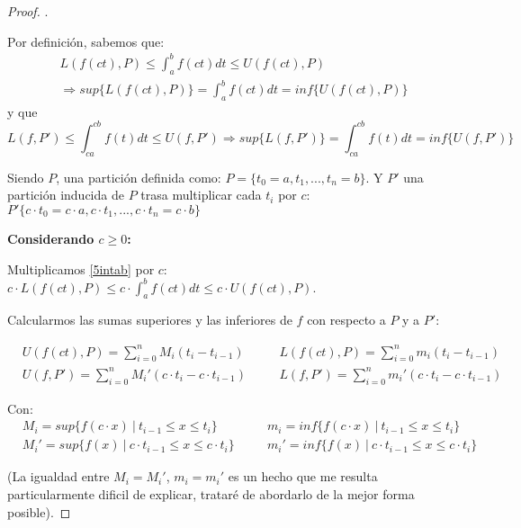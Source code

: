 \documentclass[12pt]{article}
\begin{document}
\begin{proof}
    . \medskip

    Por definici\'on, sabemos que:
    \begin{multline}
        \label{5intab}
        L(f(ct),P)\leq\int_{a}^{b}f(ct)dt\leq U(f(ct),P) \\ \Longrightarrow sup\{L(f(ct),P)\}=\int_{a}^{b}f(ct)dt=inf\{U(f(ct),P)\}
    \end{multline}
    y que
    \begin{equation}
        \label{5intcacb}
        L(f,P')\leq\int_{ca}^{cb}f(t)dt\leq U(f,P') \Longrightarrow sup\{L(f,P')\}=\int_{ca}^{cb}f(t)dt=inf\{U(f,P')\}
    \end{equation}

    Siendo $P$, una partici\'on definida como: \(P=\{t_0=a,t_1,...,t_n=b\}\). Y $P'$ una partici\'on inducida de $P$ trasa multiplicar cada $t_i$ por $c$: \(P'\{c\cdot t_0=c\cdot a,c\cdot t_1,...,c\cdot t_n=c\cdot b\}\)\bigskip

    \textbf{Considerando $c\geq0$:}\bigskip

    Multiplicamos \eqref{5intab} por $c$: \quad \(c\cdot L(f(ct),P)\leq c\cdot\int_{a}^{b}f(ct)dt\leq c\cdot U(f(ct),P)\).\bigskip

    Calcularmos las sumas superiores y las inferiores de $f$ con respecto a $P$ y a $P'$:

    \begin{align*}
        &U(f(ct),P)=\sum_{i=0}^n M_i(t_i-t_{i-1}) \quad &&L(f(ct),P)=\sum_{i=0}^n m_i(t_i-t_{i-1})\\
        &U(f,P')=\sum_{i=0}^n M_i'(c\cdot t_i-c\cdot t_{i-1}) \quad &&L(f,P')=\sum_{i=0}^n m_i'(c\cdot t_i-c\cdot t_{i-1})
    \end{align*}

    Con:
    \begin{align*}
        &M_i=sup\{f(c\cdot x) \ | \ t_{i-1}\leq x\leq t_i\} \quad &&m_i=inf\{f(c\cdot x) \ | \ t_{i-1}\leq x\leq t_i\}\\
        &M_i'=sup\{f(x) \ | \ c\cdot t_{i-1}\leq x\leq c\cdot t_i\} \quad &&m_i'=inf\{f(x) \ | \ c\cdot t_{i-1}\leq x\leq c\cdot t_i\}
    \end{align*}

    (La igualdad entre $M_i=M_i'$, $m_i=m_i'$ es un hecho que me resulta particularmente dificil de explicar, tratar\'e de abordarlo de la mejor forma posible).\bigskip


\end{proof}
\end{document}
